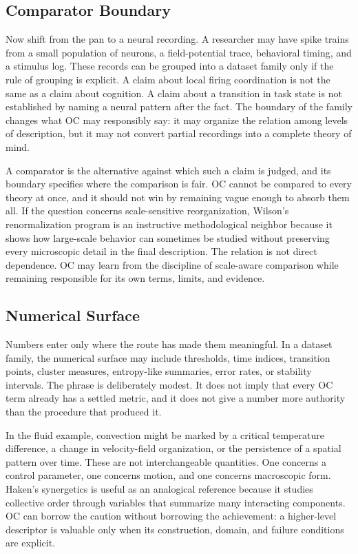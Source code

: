 \documentclass[11pt,a4paper,openany]{book}
\begin{document}
\subsection{Comparator Boundary}
Now shift from the pan to a neural recording. A researcher may have spike trains from a small population of neurons, a field-potential trace, behavioral timing, and a stimulus log. These records can be grouped into a dataset family only if the rule of grouping is explicit. A claim about local firing coordination is not the same as a claim about cognition. A claim about a transition in task state is not established by naming a neural pattern after the fact. The boundary of the family changes what OC may responsibly say: it may organize the relation among levels of description, but it may not convert partial recordings into a complete theory of mind. \cite{wilson_renormalization,landau_stat_physics}\par
A comparator is the alternative against which such a claim is judged, and its boundary specifies where the comparison is fair. OC cannot be compared to every theory at once, and it should not win by remaining vague enough to absorb them all. If the question concerns scale-sensitive reorganization, Wilson's renormalization program is an instructive methodological neighbor because it shows how large-scale behavior can sometimes be studied without preserving every microscopic detail in the final description. The relation is not direct dependence. OC may learn from the discipline of scale-aware comparison while remaining responsible for its own terms, limits, and evidence.\par
\subsection{Numerical Surface}
Numbers enter only where the route has made them meaningful. In a dataset family, the numerical surface may include thresholds, time indices, transition points, cluster measures, entropy-like summaries, error rates, or stability intervals. The phrase is deliberately modest. It does not imply that every OC term already has a settled metric, and it does not give a number more authority than the procedure that produced it. \cite{wilson_renormalization,landau_stat_physics}\par
In the fluid example, convection might be marked by a critical temperature difference, a change in velocity-field organization, or the persistence of a spatial pattern over time. These are not interchangeable quantities. One concerns a control parameter, one concerns motion, and one concerns macroscopic form. Haken's synergetics is useful as an analogical reference because it studies collective order through variables that summarize many interacting components. OC can borrow the caution without borrowing the achievement: a higher-level descriptor is valuable only when its construction, domain, and failure conditions are explicit.\par
\end{document}
